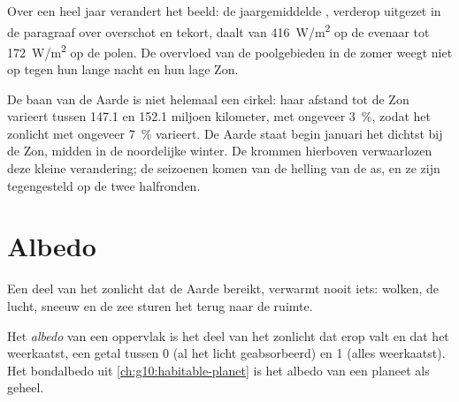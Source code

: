 Over een heel jaar verandert het beeld: de jaargemiddelde , verderop
uitgezet in de paragraaf over overschot en tekort, daalt van \qty{416}{W/m^2} op
de evenaar tot \qty{172}{W/m^2} op de polen. De overvloed van de poolgebieden in
de zomer weegt niet op tegen hun lange nacht en hun lage Zon.

\begin{remark}\label{rem:g10:earth-energy-budget:distance}
De baan van de Aarde is niet helemaal een cirkel: haar afstand tot de Zon
varieert tussen \num{147.1} en \num{152.1} miljoen kilometer, met ongeveer
\qty{3}{\percent}, zodat het zonlicht met ongeveer \qty{7}{\percent} varieert.
De Aarde staat begin januari het dichtst bij de Zon, midden in de noordelijke
winter. De krommen hierboven verwaarlozen deze kleine verandering; de seizoenen
komen van de helling van de as, en ze zijn tegengesteld op de twee halfronden.
\end{remark}

\section{Albedo}

Een deel van het zonlicht dat de Aarde bereikt, verwarmt nooit iets: wolken, de
lucht, sneeuw en de zee sturen het terug naar de ruimte.

\begin{definition}[Albedo]\label{def:g10:earth-energy-budget:albedo}
Het \emph{albedo} van een oppervlak is het deel van het zonlicht
dat erop valt en dat het weerkaatst, een getal tussen 0 (al het licht
geabsorbeerd) en 1 (alles weerkaatst). Het bondalbedo uit \cref{ch:g10:habitable-planet}
is het albedo van een planeet als geheel.
\end{definition}

